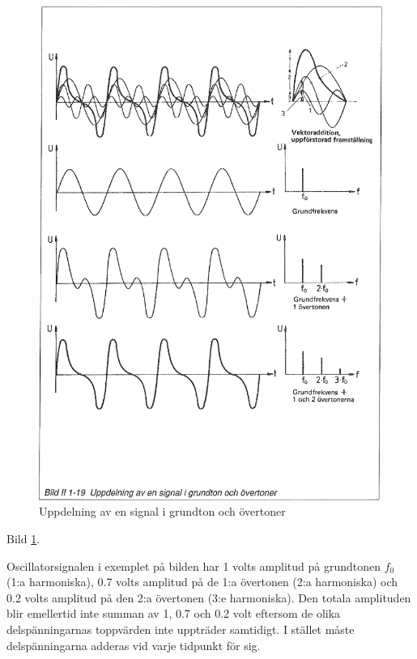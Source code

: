 \begin{figure}
\begin{center}
\includegraphics[width=\textwidth]{images/bild_2_1-19}
\caption{Uppdelning av en signal i grundton och övertoner}
\label{fig:BildII1-19}
\end{center}
\end{figure}

Bild \ref{fig:BildII1-19}.

Oscillatorsignalen i exemplet på bilden har 1 volts amplitud på grundtonen
\(f_0\) (1:a harmoniska), 0.7 volts amplitud på de 1:a övertonen
(2:a harmoniska) och 0.2 volts amplitud på den 2:a övertonen (3:e harmoniska).
Den totala amplituden blir emellertid inte summan av 1, 0.7 och 0.2 volt
eftersom de olika delspänningarnas toppvärden inte uppträder samtidigt.
I stället måste delspänningarna adderas vid varje tidpunkt för sig.

